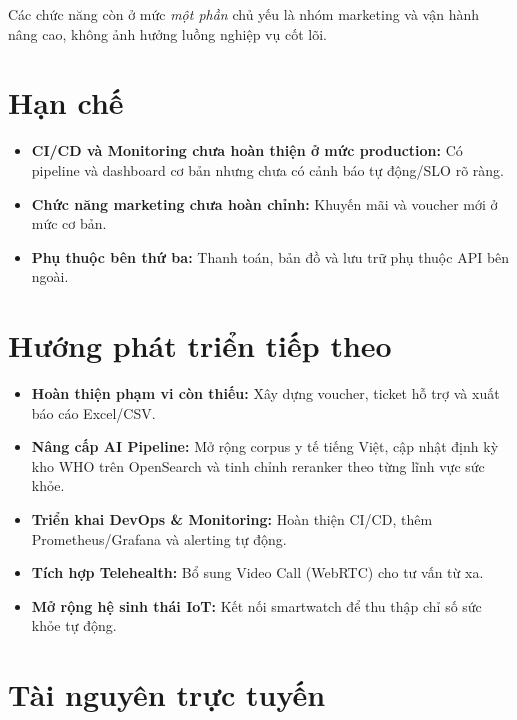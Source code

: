 Các chức năng còn ở mức \textit{một phần} chủ yếu là nhóm marketing và vận hành nâng cao, không ảnh hưởng luồng nghiệp vụ cốt lõi.

\section{Hạn chế}

\begin{itemize}
    \item \textbf{CI/CD và Monitoring chưa hoàn thiện ở mức production:} Có pipeline và dashboard cơ bản nhưng chưa có cảnh báo tự động/SLO rõ ràng.

    \item \textbf{Chức năng marketing chưa hoàn chỉnh:} Khuyến mãi và voucher mới ở mức cơ bản.

    \item \textbf{Phụ thuộc bên thứ ba:} Thanh toán, bản đồ và lưu trữ phụ thuộc API bên ngoài.
\end{itemize}

\section{Hướng phát triển tiếp theo}

\begin{itemize}
    \item \textbf{Hoàn thiện phạm vi còn thiếu:} Xây dựng voucher, ticket hỗ trợ và xuất báo cáo Excel/CSV.

    \item \textbf{Nâng cấp AI Pipeline:} Mở rộng corpus y tế tiếng Việt, cập nhật định kỳ kho WHO trên OpenSearch và tinh chỉnh reranker theo từng lĩnh vực sức khỏe.

    \item \textbf{Triển khai DevOps \& Monitoring:} Hoàn thiện CI/CD, thêm Prometheus/Grafana và alerting tự động.

    \item \textbf{Tích hợp Telehealth:} Bổ sung Video Call (WebRTC) cho tư vấn từ xa.

    \item \textbf{Mở rộng hệ sinh thái IoT:} Kết nối smartwatch để thu thập chỉ số sức khỏe tự động.
\end{itemize}

\section{Tài nguyên trực tuyến}

